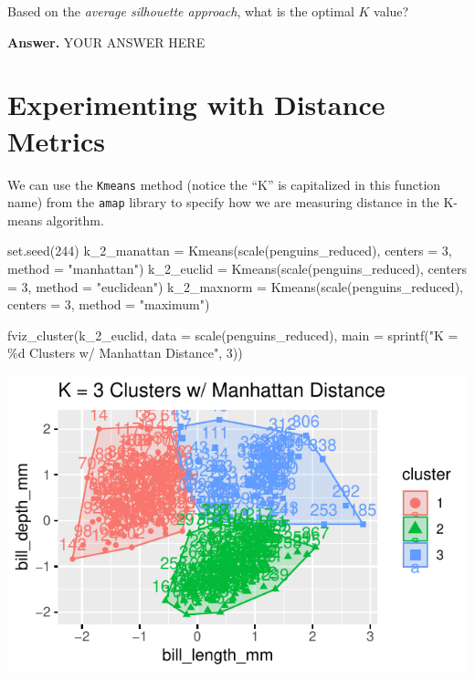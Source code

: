 \documentclass[
  letterpaper,
  DIV=11,
  numbers=noendperiod]{scrartcl}
\newenvironment{Shaded}{\begin{snugshade}}{\end{snugshade}}
\newcommand{\AttributeTok}[1]{\textcolor[rgb]{0.40,0.45,0.13}{#1}}
\newcommand{\DecValTok}[1]{\textcolor[rgb]{0.68,0.00,0.00}{#1}}
\newcommand{\FunctionTok}[1]{\textcolor[rgb]{0.28,0.35,0.67}{#1}}
\newcommand{\NormalTok}[1]{\textcolor[rgb]{0.00,0.23,0.31}{#1}}
\newcommand{\OtherTok}[1]{\textcolor[rgb]{0.00,0.23,0.31}{#1}}
\newcommand{\StringTok}[1]{\textcolor[rgb]{0.13,0.47,0.30}{#1}}
\begin{document}
Based on the \emph{average silhouette approach}, what is the optimal
\(K\) value?

\textbf{Answer.} YOUR ANSWER HERE

\section{Experimenting with Distance
Metrics}\label{experimenting-with-distance-metrics}

We can use the \texttt{Kmeans} method (notice the ``K'' is capitalized
in this function name) from the \texttt{amap} library to specify how we
are measuring distance in the K-means algorithm.

\begin{Shaded}
\begin{Highlighting}[]
\FunctionTok{set.seed}\NormalTok{(}\DecValTok{244}\NormalTok{)}
\NormalTok{k\_2\_manattan }\OtherTok{=} \FunctionTok{Kmeans}\NormalTok{(}\FunctionTok{scale}\NormalTok{(penguins\_reduced), }\AttributeTok{centers =} \DecValTok{3}\NormalTok{, }
                      \AttributeTok{method =} \StringTok{"manhattan"}\NormalTok{)}
\NormalTok{k\_2\_euclid }\OtherTok{=} \FunctionTok{Kmeans}\NormalTok{(}\FunctionTok{scale}\NormalTok{(penguins\_reduced), }\AttributeTok{centers =} \DecValTok{3}\NormalTok{, }
                    \AttributeTok{method =} \StringTok{"euclidean"}\NormalTok{)}
\NormalTok{k\_2\_maxnorm }\OtherTok{=} \FunctionTok{Kmeans}\NormalTok{(}\FunctionTok{scale}\NormalTok{(penguins\_reduced), }\AttributeTok{centers =} \DecValTok{3}\NormalTok{, }
                     \AttributeTok{method =} \StringTok{"maximum"}\NormalTok{)}



\FunctionTok{fviz\_cluster}\NormalTok{(k\_2\_euclid, }\AttributeTok{data =} \FunctionTok{scale}\NormalTok{(penguins\_reduced), }
             \AttributeTok{main =} \FunctionTok{sprintf}\NormalTok{(}\StringTok{"K = \%d Clusters w/ Manhattan Distance"}\NormalTok{, }\DecValTok{3}\NormalTok{))}
\end{Highlighting}
\end{Shaded}

\begin{center}
\includegraphics{K-Means-Mini-Demo_files/figure-pdf/unnamed-chunk-10-1.pdf}
\end{center}
\end{document}
